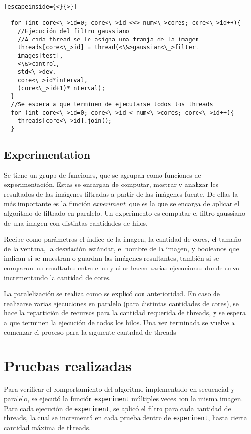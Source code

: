 \documentclass {article}
\begin{document}
\begin{lstlisting}[escapeinside={<}{>}]
  
  for (int core<\_>id=0; core<\_>id <<> num<\_>cores; core<\_>id++){
    //Ejecución del filtro gaussiano
    //A cada thread se le asigna una franja de la imagen
    threads[core<\_>id] = thread(<\&>gaussian<\_>filter,
    images[test],
    <\&>control,
    std<\_>dev,
    core<\_>id*interval,
    (core<\_>id+1)*interval);
  }
  //Se espera a que terminen de ejecutarse todos los threads
  for (int core<\_>id=0; core<\_>id < num<\_>cores; core<\_>id++){
    threads[core<\_>id].join();
  }

\end{lstlisting}


\subsection{Experimentation}

Se tiene un grupo de funciones, que se agrupan como funciones de experimentación. Estas se encargan
de computar, mostrar y analizar los resultados de las imágenes filtradas a partir de las imágenes
fuente. De ellas la más importante es la función \textit{experiment}, que es la que se encarga de
aplicar el algoritmo de filtrado en paralelo. Un experimento es computar el filtro gaussiano de una
imagen con distintas cantidades de hilos. 

Recibe como parámetros el índice de la imagen, la
cantidad de cores, el tamaño de la ventana, la desviación estándar, el nombre de la imagen, y
booleanos que indican si se muestran o guardan las imágenes resultantes, también si se comparan los
resultados entre ellos y si se hacen varias ejecuciones donde se va incrementando la cantidad de
cores.

La paralelización se realiza como se explicó con anterioridad. 
En caso de realizarse varias ejecuciones en paralelo (para distintas cantidades de cores), se hace
la repartición de recursos para la cantidad requerida de threads, y se espera a que terminen la
ejecución de todos los hilos. Una vez terminada se vuelve a comenzar el proceso para la siguiente
cantidad de threads


\section{Pruebas realizadas}
\label{sec:pruebas}
Para verificar el comportamiento del algoritmo implementado en secuencial y paralelo, se ejecutó la
función \texttt{experiment} múltiples veces con la misma imagen. Para cada ejecución de
\texttt{experiment}, se aplicó el filtro para cada cantidad de threads, la cual se incrementó en
cada prueba dentro de \texttt{experiment}, hasta cierta cantidad máxima de threads.
\end{document}
